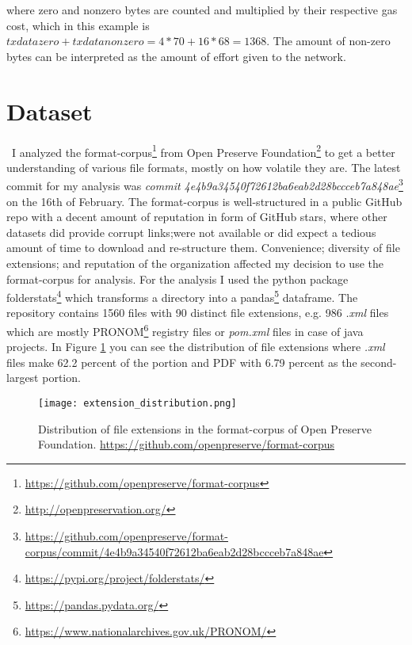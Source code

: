 where zero and nonzero bytes are counted and multiplied by their respective gas cost, which in this example is $txdatazero+txdatanonzero = 4 * 70 + 16 * 68 = 1368 $. The amount of non-zero bytes can be interpreted as the amount of effort given to the network.

\section{Dataset}\label{sec:dataset}\
I analyzed the format-corpus\footnote{\url{https://github.com/openpreserve/format-corpus}} from Open Preserve Foundation\footnote{\url{ http://openpreservation.org/}} to get a better understanding of various file formats, mostly on how volatile they are. The latest commit for my analysis was \textit{commit 4e4b9a34540f72612ba6eab2d28bccceb7a848ae}\footnote{\url{https://github.com/openpreserve/format-corpus/commit/4e4b9a34540f72612ba6eab2d28bccceb7a848ae}} on the 16th of February. The format-corpus is well-structured in a public GitHub repo with a decent amount of reputation in form of GitHub stars, where other datasets did provide corrupt links;were not available or did expect a tedious amount of time to download and re-structure them. Convenience; diversity of file extensions; and reputation of the organization affected my decision to use the format-corpus for analysis.
For the analysis I used the python package folderstats\footnote{\url{https://pypi.org/project/folderstats/}} which transforms a directory into a pandas\footnote{\url{https://pandas.pydata.org/}} dataframe. The repository contains 1560 files with 90 distinct file extensions, e.g. 986 \textit{.xml} files which are mostly PRONOM\footnote{\url{https://www.nationalarchives.gov.uk/PRONOM/}} registry files or \textit{pom.xml} files in case of java projects. In Figure \ref{fig:extension_distribution} you can see the distribution of file extensions where \textit{.xml} files make 62.2 percent of the portion and PDF with 6.79 percent as the second-largest portion.
\begin{figure}[h]
    \caption{Distribution of file extensions in the format-corpus of Open Preserve Foundation. \url{https://github.com/openpreserve/format-corpus}}
    \label{fig:extension_distribution}
    \centering
    \texttt{[image: extension\_distribution.png]}
\end{figure}

